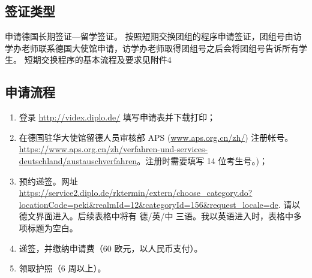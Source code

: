 \documentclass{article}
\begin{document}
\subsection{签证类型}
申请德国长期签证---留学签证。 
按照短期交换团组的程序申请签证，团组号由访学办老师联系德国大使馆申请，访学办老师取得团组号之后会将团组号告诉所有学生。
短期交换程序的基本流程及要求见附件4

\subsection{申请流程}
\begin{enumerate}
\item 登录 \url{http://videx.diplo.de/} 填写申请表并下载打印；
\item \sloppy 在德国驻华大使馆留德人员审核部 APS (\url{www.aps.org.cn/zh/}) 注册帐号。\url{https://www.aps.org.cn/zh/verfahren-und-services-deutschland/austauschverfahren}。注册时需要填写 14 位考生号。)；
\item 预约递签。网址 \url{https://service2.diplo.de/rktermin/extern/choose_category.do?locationCode=peki&realmId=12&categoryId=156&request_locale=de}. 请以德文界面进入。后续表格中将有 德/英/中 三语。我以英语进入时，表格中多项标题为空白。 
\item 递签，并缴纳申请费（60 欧元，以人民币支付）。
\item 领取护照（6 周以上）。
\end{enumerate}
\end{document}
